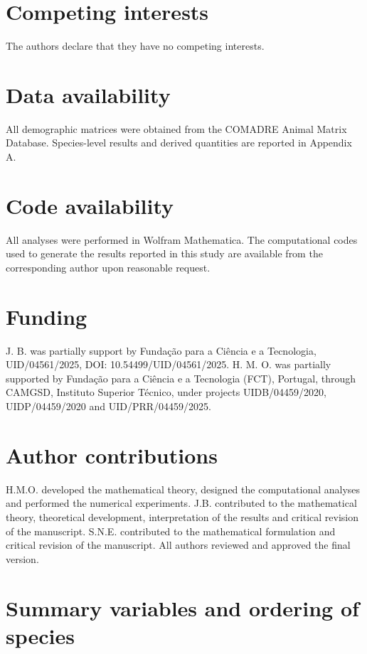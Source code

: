 \documentclass[10pt,a4paper]{amsart}
\theoremstyle{definition}
\theoremstyle{remark}
\numberwithin{equation}{section}
\begin{document}
\section*{Competing interests}

The authors declare that they have no competing interests.

\section*{Data availability}
All demographic matrices were obtained from the COMADRE Animal Matrix Database. Species-level results and derived quantities are reported in Appendix A. 

\section*{Code availability}
All analyses were performed in Wolfram Mathematica. The computational codes used to generate the results reported in this study are available from the corresponding author upon reasonable request.

\section*{Funding} J. B. was partially support by Fundação para a Ciência e a Tecnologia, UID/04561/2025, DOI: 10.54499/UID/04561/2025.
H. M. O. was partially supported by Fundação para a Ciência e a Tecnologia (FCT), Portugal, through CAMGSD, Instituto Superior Técnico, under projects UIDB/04459/2020, UIDP/04459/2020 and UID/PRR/04459/2025.


\section*{Author contributions}
H.M.O. developed the mathematical theory, designed the computational analyses and performed the numerical experiments. J.B. contributed to the mathematical theory, theoretical development, interpretation of the results and critical revision of the manuscript. S.N.E. contributed to the mathematical formulation and critical revision of the manuscript. All authors reviewed and approved the final version.

\appendix
\section{Summary variables and ordering of species}\label{app:species_results}
\end{document}
